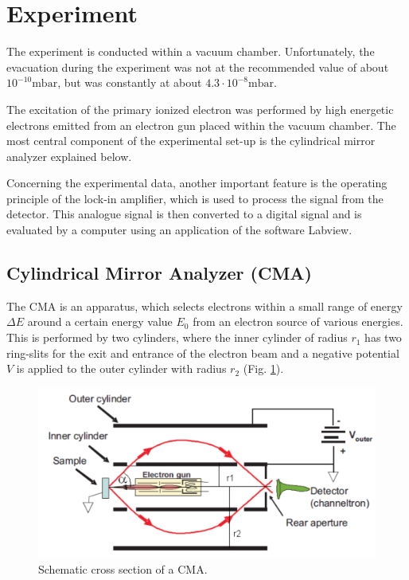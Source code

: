 \documentclass[a4paper]{scrartcl}
\numberwithin{equation}{section}
\numberwithin{figure}{section}
\numberwithin{table}{section}
\begin{document}
\section{Experiment}
The experiment is conducted within a vacuum chamber. Unfortunately, the evacuation during the experiment was not at the recommended value of about $10^{-10} \text{mbar}$, but was constantly at about $4.3 \cdot 10^{-8}\text{mbar}$. 

The excitation of the primary ionized electron was performed by high energetic electrons emitted from an electron gun placed within the vacuum chamber. The most central component of the experimental set-up is the cylindrical mirror analyzer explained below. 

Concerning the experimental data, another important feature is the operating principle of the lock-in amplifier, which is used to process the signal from the detector. This analogue signal is then converted to a digital signal and is evaluated by a computer using an application of the software Labview.
\subsection{Cylindrical Mirror Analyzer (CMA)}
The CMA is an apparatus, which selects electrons within a small range of energy $\Delta E$ around a certain energy value $E_0$ from an electron source of various energies. This is performed by two cylinders, where the inner cylinder of radius $r_1$ has two ring-slits for the exit and entrance of the electron beam and a negative potential $V$ is applied to the outer cylinder with radius $r_2$ (Fig. \ref{cma}). 

\begin{figure}[htbp]
\centering
\includegraphics[width=0.6 \textwidth]{cma.pdf}
\caption{\small Schematic cross section of a CMA. \cite{skript}}
\label{cma}
\end{figure}
\end{document}
